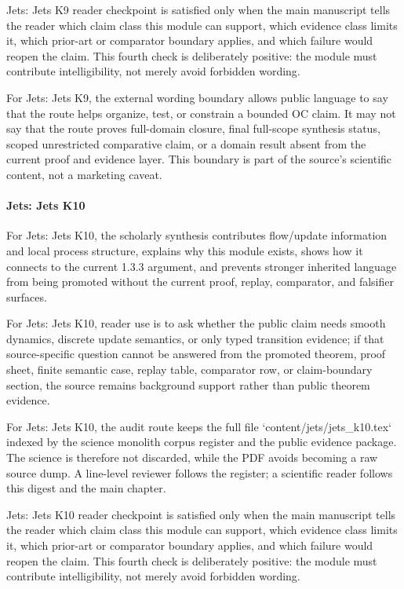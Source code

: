 Jets: Jets K9 reader checkpoint is satisfied only when the main manuscript tells the reader which claim class this module can support, which evidence class limits it, which prior-art or comparator boundary applies, and which failure would reopen the claim. This fourth check is deliberately positive: the module must contribute intelligibility, not merely avoid forbidden wording.


For Jets: Jets K9, the external wording boundary allows public language to say that the route helps organize, test, or constrain a bounded OC claim. It may not say that the route proves full-domain closure, final full-scope synthesis status, scoped unrestricted comparative claim, or a domain result absent from the current proof and evidence layer. This boundary is part of the source's scientific content, not a marketing caveat.


\paragraph{Jets: Jets K10}

For Jets: Jets K10, the scholarly synthesis contributes flow/update information and local process structure, explains why this module exists, shows how it connects to the current 1.3.3 argument, and prevents stronger inherited language from being promoted without the current proof, replay, comparator, and falsifier surfaces.


For Jets: Jets K10, reader use is to ask whether the public claim needs smooth dynamics, discrete update semantics, or only typed transition evidence; if that source-specific question cannot be answered from the promoted theorem, proof sheet, finite semantic case, replay table, comparator row, or claim-boundary section, the source remains background support rather than public theorem evidence.


For Jets: Jets K10, the audit route keeps the full file `content/jets/jets\_k10.tex` indexed by the science monolith corpus register and the public evidence package. The science is therefore not discarded, while the PDF avoids becoming a raw source dump. A line-level reviewer follows the register; a scientific reader follows this digest and the main chapter.


Jets: Jets K10 reader checkpoint is satisfied only when the main manuscript tells the reader which claim class this module can support, which evidence class limits it, which prior-art or comparator boundary applies, and which failure would reopen the claim. This fourth check is deliberately positive: the module must contribute intelligibility, not merely avoid forbidden wording.


